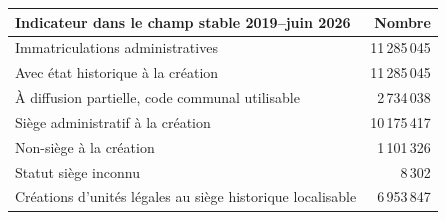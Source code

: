 \begin{tabularx}{\linewidth}{Xr}
\toprule
Indicateur dans le champ stable 2019–juin 2026 & Nombre \\
\midrule
Immatriculations administratives & 11\,285\,045 \\
Avec état historique à la création & 11\,285\,045 \\
À diffusion partielle, code communal utilisable & 2\,734\,038 \\
Siège administratif à la création & 10\,175\,417 \\
Non-siège à la création & 1\,101\,326 \\
Statut siège inconnu & 8\,302 \\
Créations d’unités légales au siège historique localisable & 6\,953\,847 \\
\bottomrule
\end{tabularx}
